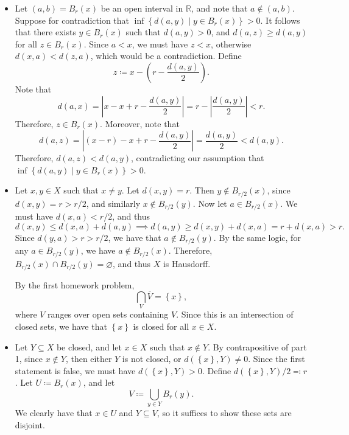 \documentclass[11pt, letterpaper]{article}
\begin{document}
\begin{itemize}
		Since every open set containing $x$ must be a union of basis sets, by logic used in the previous homework we can reduce the question of all open sets containing $x$ to that of all basis sets containing $x$. Let $B_\ell \left( z \right) $ be an open ball containing $x$, and note that $B_{\ell -d(x,z)} (x)\subseteq B_\ell (z)$ by logic used extensively in the previous homework that I don't want to type back up. Since $\ell -d(x,z)\in\mathbb{R} ^+$, there exists some $a\in A$ such that $d(x,a)<\ell -d(x,z)$, and thus $a\in B_{\ell -d(x,z)} (x)$. Therefore, $B_\ell (z)$ contains $a$. Therefore, every open set containing $x$ intersects $A$ at some point, and $x\in \overline{A} $. Since $A$ is closed, $x\in A$. This contradicts our assumption that $d(x,a)>0$ for all $a\in A$, and thus there exists $a\in A$ such that $d(x,a)=0$. By definition of a metric, we have $x=a$, and thus $x\in A$.
	\item Let $(a,b)=B_r(x)$ be an open interval in $\mathbb{R} $, and note that $a\notin (a,b)$. Suppose for contradiction that $\inf \left\{ d(a,y)\mid y\in B_r(x) \right\} >0$. It follows that there exists $y\in B_r(x)$ such that $d(a,y)>0$, and $d(a,z)\geq d(a,y)$ for all $z\in B_r(x)$. Since $a<x$, we must have $z<x$, otherwise $d(x,a)<d(z,a)$, which would be a contradiction. Define
		\[
			z\coloneqq x-\left( r-\frac{d(a,y)}{2}  \right) 
		.\]
		Note that
		\[
			d(a,x)=\left| x-x+r-\frac{d(a,y)}{2}  \right| =r-\left| \frac{d(a,y)}{2}  \right| <r
		.\]
		Therefore, $z\in B_r(x)$. Moreover, note that
		\[
			d(a,z)=\left| (x-r)-x+r-\frac{d(a,y)}{2}  \right| =\frac{d(a,y)}{2} <d(a,y)
		.\]
		Therefore, $d(a,z)<d(a,y)$, contradicting our assumption that $\inf \left\{ d(a,y)\mid y\in B_r(x) \right\} >0$.
	\item Let $x,y\in X$ such that $x\neq y$. Let $d(x,y)=r$. Then $y\notin B_{r/2} (x)$, since $d(x,y)=r>r/2$, and similarly $x\notin B_{r/2} (y)$. Now let $a\in B_{r/2} (x)$. We must have $d(x,a)<r/2$, and thus
		\[
			d(x,y)\leq d(x,a)+d(a,y)\implies d(a,y)\geq d(x,y)+d(x,a)=r+d(x,a)>r
		.\]
		Since $d(y,a)>r>r/2$, we have that $a\notin B_{r/2} (y)$. By the same logic, for any $a\in B_{r/2} (y)$, we have $a\notin B_{r/2} (x)$. Therefore, $B_{r/2} (x) \cap B_{r/2} (y)=\varnothing $, and thus $X$ is Hausdorff.

		By the first homework problem,
		\[
			\bigcap_{V} \overline{V} =\left\{ x \right\} 
		,\]
		where $V$ ranges over open sets containing $V$. Since this is an intersection of closed sets, we have that $\left\{ x \right\} $ is closed for all $x\in X$.
	\item Let $Y\subseteq X$ be closed, and let $x\in X$ such that $x\notin Y$. By contrapositive of part 1, since $x \notin Y$, then either $Y$ is not closed, or $d(\left\{ x \right\} ,Y)\neq 0$. Since the first statement is false, we must have $d(\left\{ x \right\} ,Y)>0$. Define $d(\left\{ x \right\} ,Y) /2 \eqqcolon r$. Let $U\coloneqq B_r(x)$, and let
		\[
			V\coloneqq \bigcup_{y\in Y} B_r(y)
		.\]
		We clearly have that $x\in U$ and $Y\subseteq V$, so it suffices to show these sets are disjoint.


\end{itemize}
\end{document}
